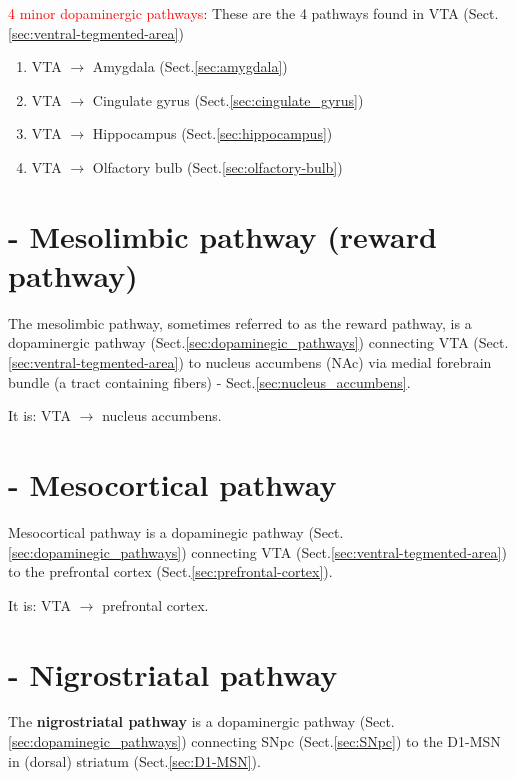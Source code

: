 \textcolor{red}{4 minor dopaminergic pathways}: These are the 4 pathways found
in VTA (Sect.\ref{sec:ventral-tegmented-area})
\begin{enumerate}
  \item VTA $\rightarrow$ Amygdala (Sect.\ref{sec:amygdala})
  
  \item VTA $\rightarrow$ Cingulate gyrus (Sect.\ref{sec:cingulate_gyrus})
  
  \item VTA $\rightarrow$ Hippocampus (Sect.\ref{sec:hippocampus})
  
  \item VTA $\rightarrow$ Olfactory bulb (Sect.\ref{sec:olfactory-bulb})
 
\end{enumerate}

\section{- Mesolimbic pathway (reward pathway)}
\label{sec:mesolimbic-pathway}

The mesolimbic pathway, sometimes referred to as the reward pathway, is a
dopaminergic pathway (Sect.\ref{sec:dopaminegic_pathways}) connecting VTA
(Sect.\ref{sec:ventral-tegmented-area}) to nucleus accumbens (NAc) via medial
forebrain bundle (a tract containing fibers) - Sect.\ref{sec:nucleus_accumbens}.



It is: VTA $\rightarrow$ nucleus accumbens.
  

\section{- Mesocortical pathway}
\label{sec:mesocortical-pathway}

Mesocortical pathway is a dopaminegic pathway
(Sect.\ref{sec:dopaminegic_pathways}) connecting VTA
(Sect.\ref{sec:ventral-tegmented-area}) to the prefrontal cortex
(Sect.\ref{sec:prefrontal-cortex}).

It is: VTA $\rightarrow$ prefrontal cortex.




\section{- Nigrostriatal pathway}
\label{sec:nigrostriatal-pathway}

The {\bf nigrostriatal pathway} is a dopaminergic pathway
(Sect.\ref{sec:dopaminegic_pathways}) connecting SNpc (Sect.\ref{sec:SNpc}) to
the D1-MSN in (dorsal) striatum (Sect.\ref{sec:D1-MSN}).

